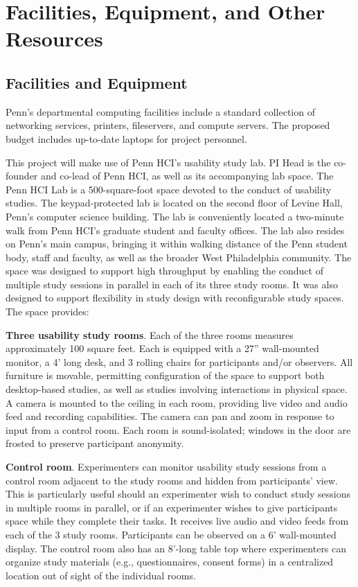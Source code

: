 \section*{Facilities, Equipment, and Other Resources}

\subsection*{Facilities and Equipment}

Penn's departmental computing facilities include a standard collection
of networking services, printers, fileservers, and compute
servers. The proposed budget includes up-to-date laptops for project
personnel.


\smallskip

This project will make use of Penn HCI's usability study lab. PI Head is the co-founder and co-lead of Penn HCI, as well as its accompanying lab space. The Penn HCI Lab is a 500-square-foot space devoted to the conduct of usability studies. The keypad-protected lab is located on the second floor of Levine Hall, Penn's computer science building. The lab is conveniently located a two-minute walk from Penn HCI's graduate student and faculty offices. The lab also resides on Penn's main campus, bringing it within walking distance of the Penn student body, staff and faculty, as well as the broader West Philadelphia community. The space was designed to support high throughput by enabling the conduct of multiple study sessions in parallel in each of its three study rooms. It was also designed to support flexibility in study design with reconfigurable study spaces. The space provides:

\textbf{Three usability study rooms}. Each of the three rooms measures approximately 100 square feet. Each is equipped with a 27'' wall-mounted monitor, a 4' long desk, and 3 rolling chairs for participants and/or observers. All furniture is movable, permitting configuration of the space to support both desktop-based studies, as well as studies involving interactions in physical space. A camera is mounted to the ceiling in each room, providing live video and audio feed and recording capabilities. The camera can pan and zoom in response to input from a control room. Each room is sound-isolated; windows in the door are frosted to preserve participant anonymity.

\textbf{Control room}. Experimenters can monitor usability study sessions from a control room adjacent to the study rooms and hidden from participants' view. This is particularly useful should an experimenter wish to conduct study sessions in multiple rooms in parallel, or if an experimenter wishes to give participants space while they complete their tasks. It receives live audio and video feeds from each of the 3 study rooms. Participants can be observed on a 6' wall-mounted display. The control room also has an 8'-long table top where experimenters can organize study materials (e.g., questionnaires, consent forms) in a centralized location out of sight of the individual rooms.

